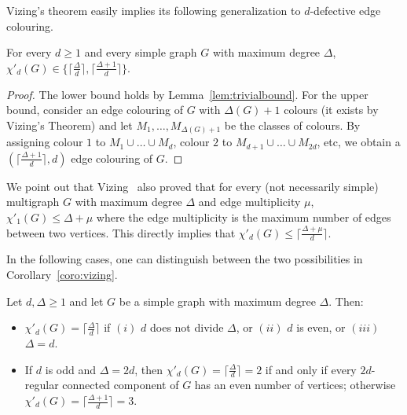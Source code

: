 Vizing's theorem easily implies its following generalization to $d$-defective edge colouring. 
\begin{corollary}\label{coro:vizing}
For every $d \geq 1$ and every simple graph $G$ with maximum degree $\Delta$, $\chi'_{d}(G) \in \{ \lceil \frac{\Delta}{d} \rceil, \lceil \frac{\Delta+1}{d} \rceil \}$.
\end{corollary}


\begin{proof}
The lower bound holds by Lemma~\ref{lem:trivialbound}. For the upper bound,  consider an edge colouring of $G$ with $\Delta(G) + 1$ colours (it exists by Vizing's Theorem) and let $M_1 , \dots , M_{\Delta(G) + 1}$ be the classes of colours. By assigning colour $1$ to $M_1 \cup \dots \cup M_{d}$, colour $2$ to $M_{d + 1} \cup \dots \cup M_{2d}$,  etc,  we obtain a $(\lceil \frac{\Delta+1}{d} \rceil,d)$ edge colouring of $G$.
\end{proof}

We point out that Vizing~\cite{V64} also proved that for every (not necessarily simple) multigraph $G$ with maximum degree $\Delta$ and edge multiplicity $\mu$, $\chi'_{1}(G) \leq \Delta + \mu$ where the edge multiplicity is the maximum number of edges between two vertices. This directly implies that $\chi'_{d}(G) \leq \lceil \frac{\Delta + \mu}{d} \rceil$.
\medskip


In the following cases, one can distinguish between the two possibilities in Corollary~\ref{coro:vizing}.

\begin{theorem}\label{thm:simple_polynomial}
Let $d, \Delta \geq 1$ and let $G$ be a simple graph with maximum degree $\Delta$. Then:

\begin{itemize}
    \item[(a)] $\chi'_d(G) = \lceil \frac{\Delta}{d} \rceil$ if $(i)$ $d$ does not divide $\Delta$, or $(ii)$ $d$ is even, or $(iii)$ $\Delta = d$.
    
    \item[(b)] If $d$ is odd and $\Delta = 2d$, then $\chi'_d(G) = \lceil \frac{\Delta}{d} \rceil = 2$ if and only if every $2d$-regular connected component of $G$ has an even number of vertices; otherwise $\chi'_d(G) = \lceil \frac{\Delta +1}{d} \rceil=  3$.
\end{itemize}

\end{theorem}

